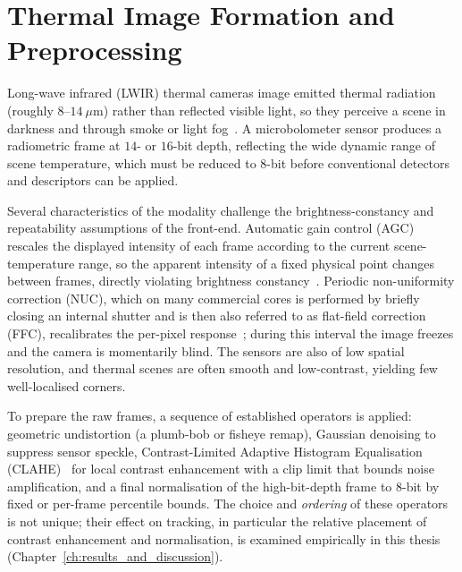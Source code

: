 \section{Thermal Image Formation and Preprocessing}
\label{sec:bg_thermal}
Long-wave infrared (LWIR) thermal cameras image emitted thermal radiation (roughly $8$--$14~\mu\mathrm{m}$) rather than reflected visible light, so they perceive a scene in darkness and through smoke or light fog~\cite{Khattak_2019, Dhrafani_2025}. A microbolometer sensor produces a radiometric frame at $14$- or $16$-bit depth, reflecting the wide dynamic range of scene temperature, which must be reduced to $8$-bit before conventional detectors and descriptors can be applied.

Several characteristics of the modality challenge the brightness-constancy and repeatability assumptions of the front-end. Automatic gain control (AGC) rescales the displayed intensity of each frame according to the current scene-temperature range, so the apparent intensity of a fixed physical point changes between frames, directly violating brightness constancy~\cite{Vidas_2012}. Periodic non-uniformity correction (NUC), which on many commercial cores is performed by briefly closing an internal shutter and is then also referred to as flat-field correction (FFC), recalibrates the per-pixel response~\cite{Gade_2014}; during this interval the image freezes and the camera is momentarily blind. The sensors are also of low spatial resolution, and thermal scenes are often smooth and low-contrast, yielding few well-localised corners.

To prepare the raw frames, a sequence of established operators is applied: geometric undistortion (a plumb-bob or fisheye remap), Gaussian denoising to suppress sensor speckle, Contrast-Limited Adaptive Histogram Equalisation (CLAHE)~\cite{Zuiderveld_1994} for local contrast enhancement with a clip limit that bounds noise amplification, and a final normalisation of the high-bit-depth frame to $8$-bit by fixed or per-frame percentile bounds. The choice and \emph{ordering} of these operators is not unique; their effect on tracking, in particular the relative placement of contrast enhancement and normalisation, is examined empirically in this thesis (Chapter~\ref{ch:results_and_discussion}).

